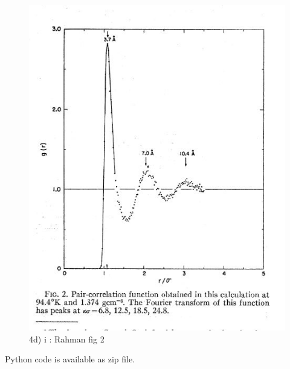 \documentclass[a4paper,10pt,english]{article}
\begin{document}
\begin{figure}[h!]
        \centering 
        \includegraphics[scale=0.6]{./py/Rahman2.jpg} 
        \caption{4d) i : Rahman fig 2 }
        \label{fig:Rahman2}
\end{figure}

Python code is available as zip file.
\end{document}
